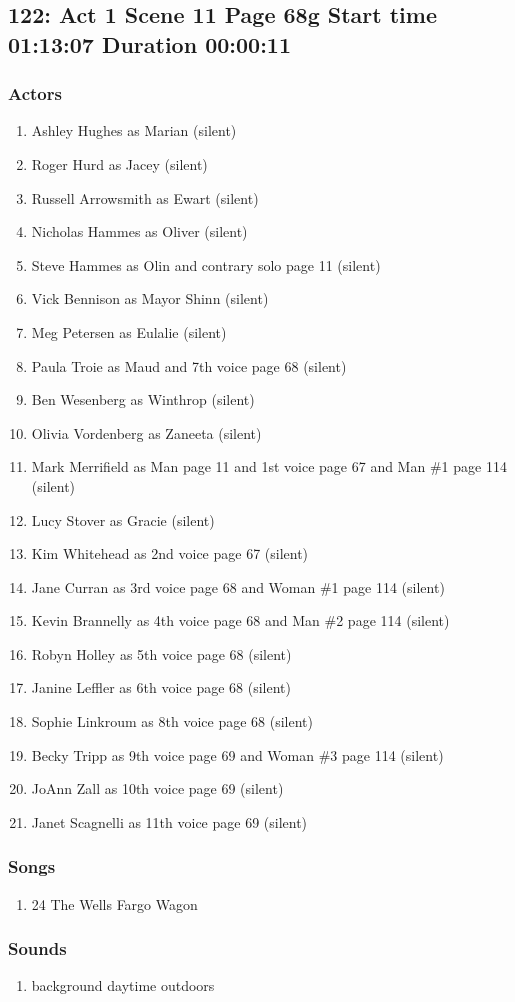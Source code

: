 \subsection{122: Act 1 Scene 11 Page 68g Start time 01:13:07 Duration 00:00:11}

\subsubsection{Actors}
\begin{enumerate}
\item Ashley Hughes as Marian (silent)
\item Roger Hurd as Jacey (silent)
\item Russell Arrowsmith as Ewart (silent)
\item Nicholas Hammes as Oliver (silent)
\item Steve Hammes as Olin and contrary solo page 11 (silent)
\item Vick Bennison as Mayor Shinn (silent)
\item Meg Petersen as Eulalie (silent)
\item Paula Troie as Maud and 7th voice page 68 (silent)
\item Ben Wesenberg as Winthrop (silent)
\item Olivia Vordenberg as Zaneeta (silent)
\item Mark Merrifield as Man page 11 and 1st voice page 67 and Man \#1 page 114 (silent)
\item Lucy Stover as Gracie (silent)
\item Kim Whitehead as 2nd voice page 67 (silent)
\item Jane Curran as 3rd voice page 68 and Woman \#1 page 114 (silent)
\item Kevin Brannelly as 4th voice page 68 and Man \#2 page 114 (silent)
\item Robyn Holley as 5th voice page 68 (silent)
\item Janine Leffler as 6th voice page 68 (silent)
\item Sophie Linkroum as 8th voice page 68 (silent)
\item Becky Tripp as 9th voice page 69 and Woman \#3 page 114 (silent)
\item JoAnn Zall as 10th voice page 69 (silent)
\item Janet Scagnelli as 11th voice page 69 (silent)
\end{enumerate}

\subsubsection{Songs}
\begin{enumerate}
\item 24 The Wells Fargo Wagon
\end{enumerate}\subsubsection{Sounds}
\begin{enumerate}
\item background daytime outdoors
\end{enumerate}
